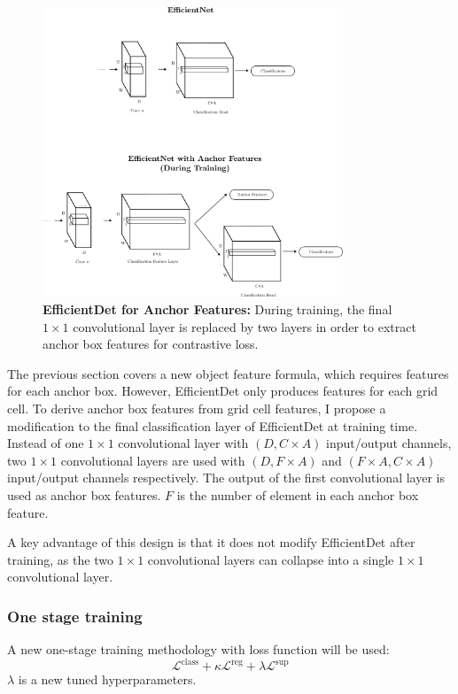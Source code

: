 \documentclass[12pt,a4paper,twoside,openright]{report}
\newcommand{\suploss}{\mathcal{L}^\text{sup}}
\newcommand{\clsloss}{\mathcal{L}^\text{class}}
\newcommand{\regloss}{\mathcal{L}^\text{reg}}
\begin{document}
\begin{figure}[h]
    \centering
    \includegraphics[width=0.8\textwidth]{figs/implementation/efficientdet_new_head.png}
    \caption{\textbf{EfficientDet for Anchor Features: }During training, the final $1\times 1$ convolutional layer is replaced by two layers in order to extract anchor box features for contrastive loss.}
    \label{fig:edet_new_head}
\end{figure}
The previous section covers a new object feature formula, which requires features for each anchor box. However, EfficientDet only produces features for each grid cell. To derive anchor box features from grid cell features, I propose a modification to the final classification layer of EfficientDet at training time. Instead of one $1\times 1$ convolutional layer with $(D, C\times A)$ input/output channels, two $1\times 1$ convolutional layers are used with $(D, F\times A)$ and $(F\times A, C\times A)$ input/output channels respectively.  The output of the first convolutional layer is used as anchor box features. $F$ is the number of element in each anchor box feature. 

A key advantage of this design is that it does not modify EfficientDet after training, as the two $1\times 1$ convolutional layers can collapse into a single $1\times 1$ convolutional layer. 

\subsubsection{One stage training}
A new one-stage training methodology with loss function will be used:
$$
\clsloss + \kappa \regloss + \lambda \suploss
$$
$\lambda$ is a new tuned hyperparameters.
\end{document}
